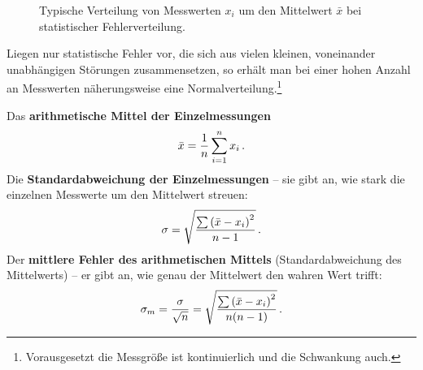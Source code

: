 \begin{figure}
{%
    }
    \caption[Typische Verteilung von Messwerten um den Mittelwert bei statistischer Fehlerverteilung]{Typische Verteilung von Messwerten $x_i$ um den Mittelwert $\bar{x}$ bei statistischer Fehlerverteilung.}\label{fig: stat_Verteilung_Messwerte}
\end{figure}
Liegen nur statistische Fehler vor, die sich aus vielen kleinen, voneinander unabhängigen Störungen zusammensetzen, so erhält man bei einer hohen Anzahl an Messwerten näherungsweise eine Normalverteilung.\footnote{Vorausgesetzt die Messgröße ist kontinuierlich und die Schwankung auch.}

\begin{importantbox}[]{}
    Das \textbf{arithmetische Mittel der Einzelmessungen}
    \begin{equation}
        \bar{x} = \frac{1}{n} \sum_{i=1}^n x_i \,.
    \end{equation}
    Die \textbf{Standardabweichung der Einzelmessungen} -- sie gibt an, wie stark die einzelnen Messwerte um den Mittelwert streuen:
    \begin{equation}
        \sigma = \sqrt{\frac{\sum {\left( \bar{x} - x_i \right)}^2}{n-1}} \,.
    \end{equation}
    Der \textbf{mittlere Fehler des arithmetischen Mittels} (Standardabweichung des Mittelwerts) -- er gibt an, wie genau der Mittelwert den wahren Wert trifft:
    \begin{equation}
        \sigma_m = \frac{\sigma}{\sqrt{n}} = \sqrt{\frac{\sum {\left(\bar{x} - x_i \right)}^2}{n(n-1)}} \,.
    \end{equation}
\end{importantbox}

